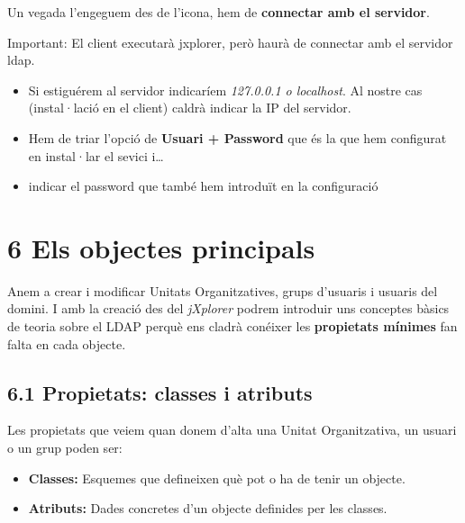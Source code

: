 \documentclass[
  12 pt,
  a4paper,
]{article}
\providecommand{\tightlist}{%
  \setlength{\itemsep}{0pt}\setlength{\parskip}{0pt}}
\begin{document}
Un vegada l'engeguem des de l'icona, hem de \textbf{connectar amb el
servidor}.

Important: El client executarà jxplorer, però haurà de connectar amb el
servidor ldap.

\begin{itemize}
\item
  Si estiguérem al servidor indicaríem \emph{127.0.0.1 o localhost}. Al
  nostre cas (instal·lació en el client) caldrà indicar la IP del
  servidor.
\item
  Hem de triar l'opció de \textbf{Usuari + Password} que és la que hem
  configurat en instal·lar el sevici i\ldots{}
\item
  indicar el password que també hem introduït en la configuració
\end{itemize}

\section{6 Els objectes principals}\label{els-objectes-principals}

Anem a crear i modificar Unitats Organitzatives, grups d'usuaris i
usuaris del domini. I amb la creació des del \emph{jXplorer} podrem
introduir uns conceptes bàsics de teoria sobre el LDAP perquè ens cladrà
conéixer les \textbf{propietats mínimes} fan falta en cada objecte.

\subsection{6.1 Propietats: classes i
atributs}\label{propietats-classes-i-atributs}

Les propietats que veiem quan donem d'alta una Unitat Organitzativa, un
usuari o un grup poden ser:

\begin{itemize}
\tightlist
\item
  \textbf{Classes:} Esquemes que defineixen què pot o ha de tenir un
  objecte.\\
\item
  \textbf{Atributs:} Dades concretes d'un objecte definides per les
  classes.
\end{itemize}
\end{document}
